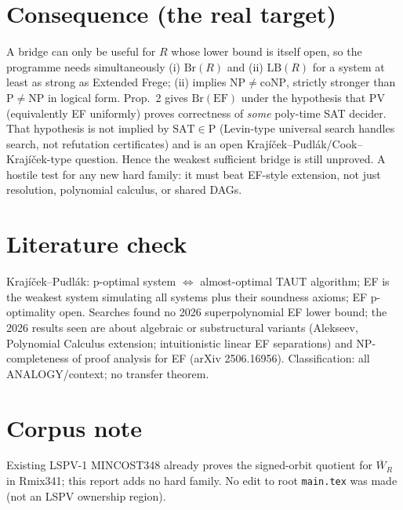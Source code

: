 \documentclass{article}
\begin{document}
\section*{Consequence (the real target)}
A bridge can only be useful for $R$ whose lower bound is itself open, so the programme needs simultaneously (i) $\mathrm{Br}(R)$ and (ii) $\mathrm{LB}(R)$ for a system at least as strong as Extended Frege; (ii) implies $\mathrm{NP}\ne\mathrm{coNP}$, strictly stronger than $\mathrm P\ne\mathrm{NP}$ in logical form. Prop.~2 gives $\mathrm{Br}(\mathrm{EF})$ under the hypothesis that $\mathrm{PV}$ (equivalently EF uniformly) proves correctness of \emph{some} poly-time SAT decider. That hypothesis is not implied by $\mathrm{SAT}\in\mathrm P$ (Levin-type universal search handles search, not refutation certificates) and is an open Krajíček--Pudlák/Cook--Krajíček-type question. Hence the weakest sufficient bridge is still unproved. A hostile test for any new hard family: it must beat EF-style extension, not just resolution, polynomial calculus, or shared DAGs.

\section*{Literature check}
Krajíček--Pudlák: p-optimal system $\iff$ almost-optimal TAUT algorithm; EF is the weakest system simulating all systems plus their soundness axioms; EF p-optimality open. Searches found no 2026 superpolynomial EF lower bound; the 2026 results seen are about algebraic or substructural variants (Alekseev, Polynomial Calculus extension; intuitionistic linear EF separations) and NP-completeness of proof analysis for EF (arXiv 2506.16956). Classification: all ANALOGY/context; no transfer theorem.

\section*{Corpus note}
Existing LSPV-1 MINCOST348 already proves the signed-orbit quotient for $\overline W_R$ in Rmix341; this report adds no hard family. No edit to root \texttt{main.tex} was made (not an LSPV ownership region).
\end{document}
